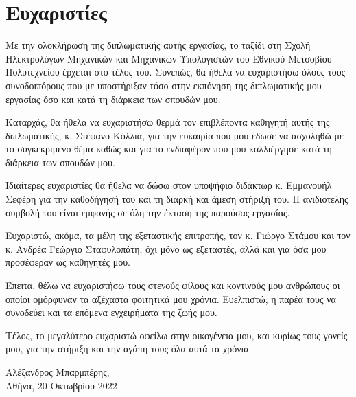 \chapter*{Ευχαριστίες}

Με την ολοκλήρωση της διπλωματικής αυτής εργασίας, το ταξίδι στη Σχολή Ηλεκτρολόγων Μηχανικών και Μηχανικών Υπολογιστών του Εθνικού Μετσοβίου Πολυτεχνείου έρχεται στο τέλος του. Συνεπώς, θα ήθελα να ευχαριστήσω όλους τους συνοδοιπόρους που με υποστήριξαν τόσο στην εκπόνηση της διπλωματικής μου εργασίας όσο και κατά τη διάρκεια των σπουδών μου.\par

Καταρχάς, θα ήθελα να ευχαριστήσω θερμά τον επιβλέποντα καθηγητή αυτής της διπλωματικής, κ. Στέφανο Κόλλια, για την ευκαιρία που μου έδωσε να ασχοληθώ με το συγκεκριμένο θέμα καθώς και για το ενδιαφέρον που μου καλλιέργησε κατά τη διάρκεια των σπουδών μου.\par

Ιδιαίτερες ευχαριστίες θα ήθελα να δώσω στον υποψήφιο διδάκτωρ κ. Εμμανουήλ Σεφέρη για την καθοδήγησή του και τη διαρκή και άμεση στήριξή του. Η ανιδιοτελής συμβολή του είναι εμφανής σε όλη την έκταση της παρούσας εργασίας.\par

Ευχαριστώ, ακόμα, τα μέλη της εξεταστικής επιτροπής, τον κ. Γιώργο Στάμου και τον
κ. Ανδρέα Γεώργιο Σταφυλοπάτη, όχι μόνο ως εξεταστές, αλλά και για όσα μου προσέφεραν ως καθηγητές
μου.\par

Έπειτα, θέλω να ευχαριστήσω τους στενούς φίλους και κοντινούς μου ανθρώπους οι οποίοι ομόρφυναν τα αξέχαστα φοιτητικά μου χρόνια. Ευελπιστώ, η παρέα τους να συνοδεύει και τα επόμενα εγχειρήματα της ζωής μου.\par

Τέλος, το μεγαλύτερο ευχαριστώ οφείλω στην οικογένεια μου, και κυρίως τους γονείς μου, για την στήριξη και την αγάπη τους όλα αυτά τα χρόνια.\par
\begin{flushright}
    Αλέξανδρος Μπαρμπέρης,\\
    Αθήνα, 20 Οκτωβρίου 2022
\end{flushright}
